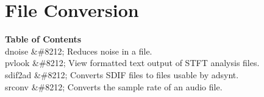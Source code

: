 \begin{comment}
\documentclass[10pt]{article}
\usepackage{fullpage, graphicx, url}
\setlength{\parskip}{1ex}
\setlength{\parindent}{0ex}
\title{File Conversion}



\begin{tabular}{ccc}
The Alternative Csound Reference Manual & & \\
Previous &The Utility Programs &Next

\end{tabular}

\end{comment}
\section{File Conversion}
\begin{description}
\item[\textbf{Table of Contents}
]\item[dnoise \&\#8212; Reduces noise in a file. ]\item[pvlook \&\#8212; View formatted text output of STFT analysis files. ]\item[sdif2ad \&\#8212; Converts SDIF files to files usable by adsynt. ]\item[srconv \&\#8212; Converts the sample rate of an audio file. ]
\end{description}


\begin{comment}
\begin{tabular}{lcr}
Previous &Home &Next \\
sndinfo &Up &dnoise

\end{tabular}



\end{comment}
